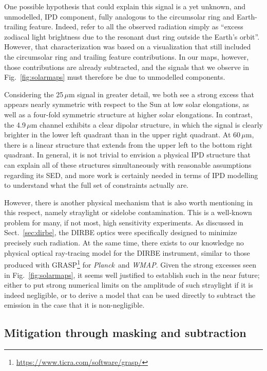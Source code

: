 \documentclass{aa}
\def\Planck{\textit{Planck}}
\def\WMAP{\textit{WMAP}}
\begin{document}
One possible hypothesis that could explain this signal is a yet
unknown, and unmodelled, IPD component, fully analogous to the
circumsolar ring and Earth-trailing feature. Indeed,
\citet{leinert:1998} refer to all the observed radiation simply as
``excess zodiacal light brightness due to the resonant dust ring
outside the Earth’s orbit''. However, that characterization was based
on a visualization that still included the circumsolar ring and
trailing feature contributions. In our maps, however, those
contributions are already subtracted, and the signals that we observe
in Fig.~\ref{fig:solarmaps} must therefore be due to unmodelled
components.

Considering the 25$\,\mu$m signal in greater detail, we both see a strong
excess that appears nearly symmetric with respect to the Sun at low
solar elongations, as well as a four-fold symmetric structure at
higher solar elongations. In contrast, the 4.9$\,\mu$m channel
exhibits a clear dipolar structure, in which the signal is clearly
brighter in the lower left quadrant than in the upper right
quadrant. At 60$\,\mu$m, there is a linear structure that extends from
the upper left to the bottom right quadrant. In general, it is not
trivial to envision a physical IPD structure that can explain all of
these structures simultaneously with reasonable assumptions regarding
its SED, and more work is certainly needed in terms of IPD modelling
to understand what the full set of constraints actually are.

However, there is another physical mechanism that is also worth
mentioning in this respect, namely straylight or sidelobe
contamination. This is a well-known problem for many, if not most,
high sensitivity experiments. As discussed in
Sect.~\ref{sec:dirbe}, the DIRBE optics were specifically designed to
minimize precisely such radiation. At the same time, there exists to
our knowledge no physical optical ray-tracing model for the DIRBE
instrument, similar to those produced with GRASP\footnote{\url{https://www.ticra.com/software/grasp/}} for \Planck\ and
\WMAP. Given the strong excesses seen in Fig.~\ref{fig:solarmaps}, it
seems well justified to establish such in the near future; either to
put strong numerical limits on the amplitude of such straylight if it
is indeed negligible, or to derive a model that can be used directly
to subtract the emission in the case that it is non-negligible.



\subsection{Mitigation through masking and subtraction}
\end{document}
